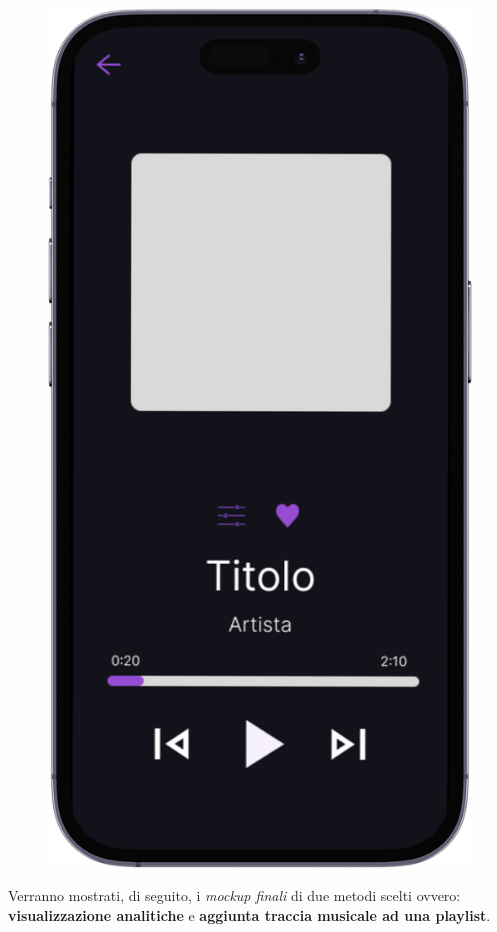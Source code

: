 \documentclass{article}
\begin{document}
\begin{figure}[htbp]
\begin{minipage}{0.18\textwidth}
					\includegraphics[width=\textwidth]{foto7}
				\end{minipage}
			\end{figure}
			\newpage
		Verranno mostrati, di seguito, i\textit{ mockup finali} di due metodi scelti ovvero: \textbf{visualizzazione analitiche} e \textbf{aggiunta traccia musicale ad una playlist}.
\end{document}
